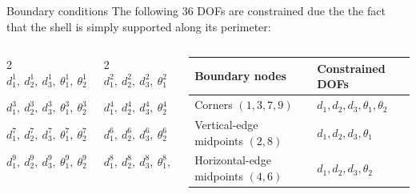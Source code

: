 \documentclass[aspectratio=169]{beamer}
\begin{document}
\begin{frame}{Boundary conditions}
  The following 36 DOFs are constrained due the the fact that the shell is simply supported along its perimeter:
  \begin{columns}
    \begin{multicols}{2}
      $d_1^1,\ d_2^1,\ d_3^1,\ \theta_1^1,\ \theta_2^1$

      $d_1^3,\ d_2^3,\ d_3^3,\ \theta_1^3,\ \theta_2^3$

      $d_1^7,\ d_2^7,\ d_3^7,\ \theta_1^7,\ \theta_2^7$

      $d_1^9,\ d_2^9,\ d_3^9,\ \theta_1^9,\ \theta_2^9$
    \end{multicols}
    \begin{multicols}{2}
      $d_1^2,\ d_2^2,\ d_3^2,\ \theta_1^2$

      $d_1^4,\ d_2^4,\ d_3^4,\ \theta_2^4$

      $d_1^6,\ d_2^6,\ d_3^6,\ \theta_2^6$

      $d_1^8,\ d_2^8,\ d_3^8,\ \theta_1^8,$
    \end{multicols}
    \vspace{0.2cm}
    \begin{center}
      \begin{tabular}{ll}
        \hline
        \small \textbf{Boundary nodes} & \small\textbf{Constrained DOFs}       \\
        \hline
        \small Corners $(1,3,7,9)$
                                       & \small$d_1,d_2,d_3,\theta_1,\theta_2$ \\
        \small Vertical-edge midpoints $(2,8)$
                                       & \small$d_1,d_2,d_3,\theta_1$          \\
        \small Horizontal-edge midpoints $(4,6)$
                                       & \small$d_1,d_2,d_3,\theta_2$          \\
        \hline
      \end{tabular}
    \end{center}
    \vspace{-2cm}


\end{columns}
\end{frame}
\end{document}
